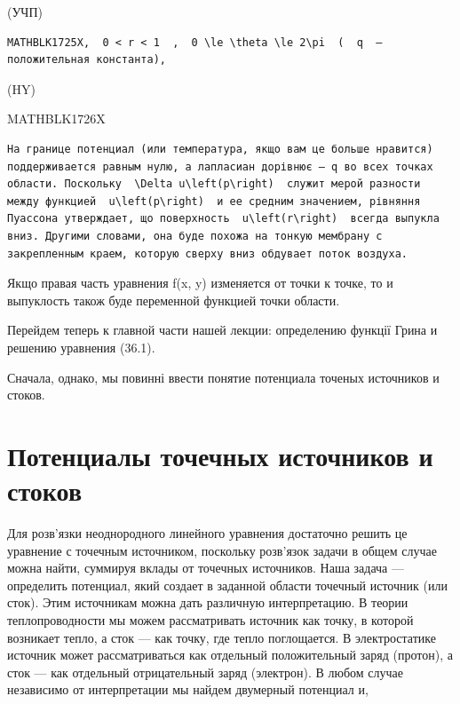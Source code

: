 \documentclass[
  ukrainian,
]{article}
\begin{document}
(УЧП)

\begin{verbatim}
MATHBLK1725X,  0 < r < 1  ,  0 \le \theta \le 2\pi  (  q  —положительная константа),
\end{verbatim}

(HY)

MATHBLK1726X

\begin{verbatim}
На границе потенциал (или температура, якщо вам це больше нравится) поддерживается равным нулю, а лапласиан дорівнює — q во всех точках области. Поскольку  \Delta u\left(p\right)  служит мерой разности между функцией  u\left(p\right)  и ее средним значением, рівняння Пуассона утверждает, що поверхность  u\left(r\right)  всегда выпукла вниз. Другими словами, она буде похожа на тонкую мембрану с закрепленным краем, которую сверху вниз обдувает поток воздуха.
\end{verbatim}

Якщо правая часть уравнения f(x, y) изменяется от точки к точке, то и
выпуклость також буде переменной функцией точки области.

Перейдем теперь к главной части нашей лекции: определению функції Грина
и решению уравнения (36.1).

Сначала, однако, мы повинні ввести понятие потенциала точеных источников
и стоков.

\section{Потенциалы точечных источников и
стоков}\label{ux43fux43eux442ux435ux43dux446ux438ux430ux43bux44b-ux442ux43eux447ux435ux447ux43dux44bux445-ux438ux441ux442ux43eux447ux43dux438ux43aux43eux432-ux438-ux441ux442ux43eux43aux43eux432}

Для розв'язки неоднородного линейного уравнения достаточно решить це
уравнение с точечным источником, поскольку розв'язок задачи в общем
случае можна найти, суммируя вклады от точечных источников. Наша задача
--- определить потенциал, який создает в заданной области точечный
источник (или сток). Этим источникам можна дать различную интерпретацию.
В теории теплопроводности мы можем рассматривать источник как точку, в
которой возникает тепло, а сток --- как точку, где тепло поглощается. В
электростатике источник может рассматриваться как отдельный
положительный заряд (протон), а сток --- как отдельный отрицательный
заряд (электрон). В любом случае независимо от интерпретации мы найдем
двумерный потенциал и,
\end{document}
